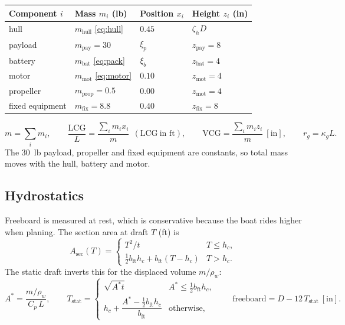 \documentclass[11pt,a4paper]{article}
\renewcommand{\_}{\textunderscore\allowbreak}
\newcommand{\lcg}{\mathrm{LCG}}
\newcommand{\vcg}{\mathrm{VCG}}
\begin{document}
\begin{center}\small
\begin{tabular}{@{}l l l l@{}}
\toprule
Component $i$ & Mass $m_i$ (lb) & Position $x_i$ & Height $z_i$ (in)\\
\midrule
hull    & $m_{\mathrm{hull}}$ \eqref{eq:hull} & $0.45$   & $\zeta_h D$ \\
payload & $m_{\mathrm{pay}}=30$               & $\xi_p$  & $z_{\mathrm{pay}}=8$ \\
battery & $m_{\mathrm{bat}}$ \eqref{eq:pack}  & $\xi_b$  & $z_{\mathrm{bat}}=4$ \\
motor   & $m_{\mathrm{mot}}$ \eqref{eq:motor} & $0.10$   & $z_{\mathrm{mot}}=4$ \\
propeller & $m_{\mathrm{prop}}=0.5$           & $0.00$   & $z_{\mathrm{mot}}=4$ \\
fixed equipment & $m_{\mathrm{fix}}=8.8$      & $0.40$   & $z_{\mathrm{fix}}=8$ \\
\bottomrule
\end{tabular}
\end{center}
\begin{equation}
  m = \sum_i m_i, \qquad
  \frac{\lcg}{L} = \frac{\sum_i m_i x_i}{m}\ \ (\lcg\ \text{in ft}), \qquad
  \vcg = \frac{\sum_i m_i z_i}{m}\ [\mathrm{in}], \qquad
  r_g = \kappa_g L.
  \label{eq:balance}
\end{equation}
The 30~lb payload, propeller and fixed equipment are constants, so total mass moves with the hull, battery and motor.

\subsection{Hydrostatics}
Freeboard is measured at rest, which is conservative because the boat rides higher when planing.
The section area at draft $T$ (ft) is
\begin{equation}
  A_{\mathrm{sec}}(T) =
  \begin{cases}
    T^2/t & T \le h_c,\\
    \tfrac12 b_{\mathrm{ft}}h_c + b_{\mathrm{ft}}(T - h_c) & T > h_c.
  \end{cases}
  \label{eq:section}
\end{equation}
The static draft inverts this for the displaced volume $m/\rho_w$:
\begin{equation}
  A^\ast = \frac{m/\rho_w}{C_p\,L},\qquad
  T_{\mathrm{stat}} =
  \begin{cases}
    \sqrt{A^\ast t} & A^\ast \le \tfrac12 b_{\mathrm{ft}}h_c,\\[2pt]
    h_c + \dfrac{A^\ast - \tfrac12 b_{\mathrm{ft}}h_c}{b_{\mathrm{ft}}} & \text{otherwise},
  \end{cases}
  \qquad
  \text{freeboard} = D - 12\,T_{\mathrm{stat}}\ [\mathrm{in}].
  \label{eq:draft}
\end{equation}
\end{document}
